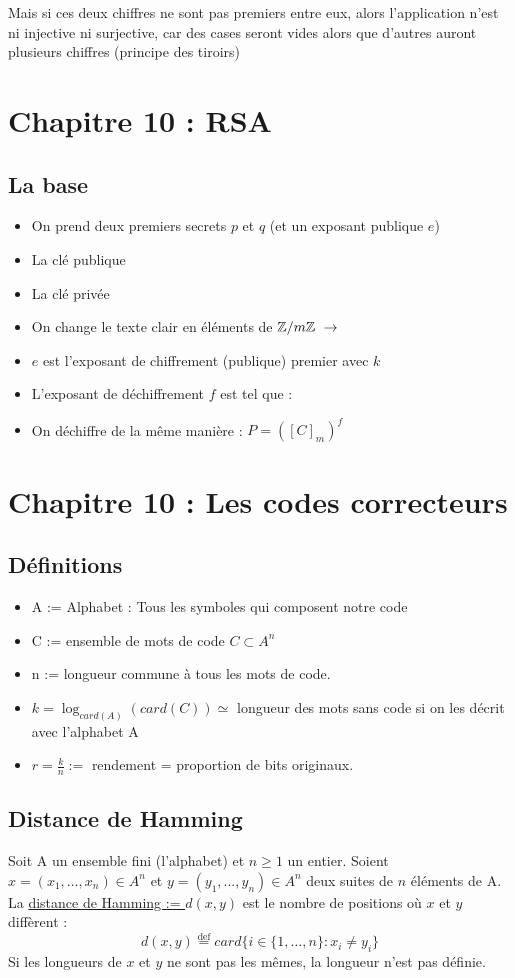 \documentclass[11pt,a4paper]{article}
\begin{document}
Mais si ces deux chiffres ne sont pas premiers entre eux, alors l'application n'est ni injective ni surjective, car des cases seront vides alors que d'autres auront plusieurs chiffres (principe des tiroirs)
\section{Chapitre 10 : RSA}
\subsection{La base}
\begin{itemize}
	\item 	On prend deux premiers secrets $p$ et $q$ (et un exposant publique $e$)
	\item 	La clé publique 
	\item 	La clé privée 
	\item 	On change le texte clair en éléments de $\mathbb{Z}/m\mathbb{Z}\ \to$ 
	\item 	$e$ est l'exposant de chiffrement (publique) premier avec $k$
	\item 	L'exposant de déchiffrement $f$ est tel que : \fbox{$[f]_k = ([e]_k])^{-1}$}
	\item	On déchiffre de la même manière : $P = ([C]_m)^f$
\end{itemize}


\section[Les codes correcteurs]{Chapitre 10 : Les codes correcteurs}
\subsection{Définitions}
\begin{itemize}
	\item A := Alphabet : Tous les symboles qui composent notre code
	\item C := ensemble de mots de code $C \subset A^n$
	\item n := longueur commune à tous les mots de code.
	\item $k = \log_{card(A)}(card(C)) \simeq$ longueur des mots sans code si on les décrit avec l'alphabet A
	\item $r = \frac{k}{n} :=$ rendement = proportion de bits originaux.
\end{itemize}
\subsection{Distance de Hamming}
Soit A un ensemble fini (l'alphabet) et $n \geq 1$ un entier. Soient $x = (x_1,\ldots,x_n) \in A^n$ et $y = (y_1,\ldots,y_n) \in A^n$ deux suites de $n$ éléments de A. La \uline{distance de Hamming := $d(x,y)$} est le nombre de positions où $x$ et $y$ diffèrent :
\begin{equation*}
	d(x,y) \overset{\text{def}}{=} card\{i \in \{1,\ldots,n\} : x_i \neq y_i \}
\end{equation*}
Si les longueurs de $x$ et $y$ ne sont pas les mêmes, la longueur n'est pas définie.
\end{document}
